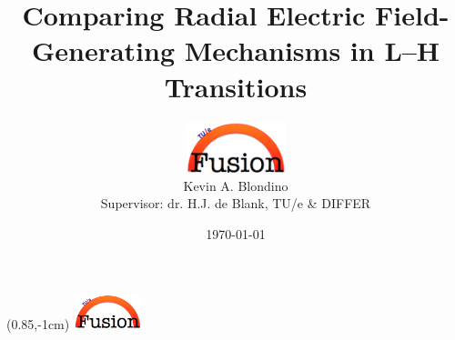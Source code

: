 \documentclass[10pt]{beamer}
\title[$E_r$-Generating Mechanisms in L-H Transitions]{Comparing Radial Electric Field-Generating Mechanisms in L--H Transitions}
\author[K.A. Blondino]{\includegraphics[height=1.5cm]{../Graphics/tue_fusion_logo.png} \\ Kevin A. Blondino \\
	Supervisor: dr. H.J. de Blank, TU/e \& DIFFER}
\institute[TU/e]{Eindhoven University of Technology \\
	\medskip
	\textit{k.blondino@student.tue.nl}}
\date{\today}
\begin{document}
\begin{frame} %
\setcounter{framenumber}{0}
\titlepage
\end{frame}

{
\begin{textblock*}{100mm}(0.85\textwidth,-1cm)
	\includegraphics[height=1cm,width=2cm]{../Graphics/tue_fusion_logo.png}
\end{textblock*}
}

\begin{frame} %
\setcounter{framenumber}{0}
\tableofcontents
\end{frame}

\end{document}
